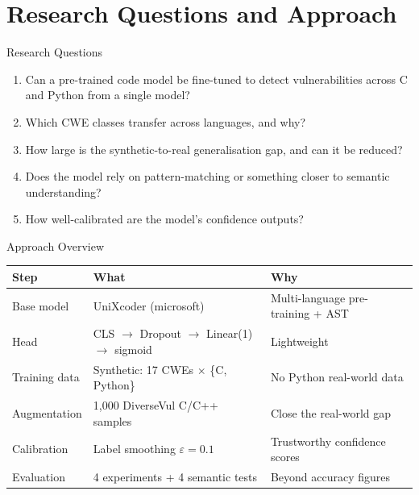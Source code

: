 \documentclass[aspectratio=169]{beamer}
\begin{document}
\section{Research Questions and Approach}

\begin{frame}{Research Questions}
  \begin{enumerate}
    \item[\textbf{RQ1}] Can a pre-trained code model be fine-tuned to detect
      vulnerabilities across C and Python from a single model?
    \item[\textbf{RQ2}] Which CWE classes transfer across languages, and why?
    \item[\textbf{RQ3}] How large is the synthetic-to-real generalisation gap,
      and can it be reduced?
    \item[\textbf{RQ4}] Does the model rely on pattern-matching or something
      closer to semantic understanding?
    \item[\textbf{RQ5}] How well-calibrated are the model's confidence outputs?
  \end{enumerate}
\end{frame}

\begin{frame}{Approach Overview}
  \begin{center}
    \begin{tabular}{lll}
      \toprule
      \textbf{Step} & \textbf{What} & \textbf{Why} \\
      \midrule
      Base model    & UniXcoder (microsoft) & Multi-language pre-training + AST \\
      Head          & CLS $\to$ Dropout $\to$ Linear(1) $\to$ sigmoid & Lightweight \\
      Training data & Synthetic: 17 CWEs $\times$ \{C, Python\} & No Python real-world data \\
      Augmentation  & 1{,}000 DiverseVul C/C++ samples & Close the real-world gap \\
      Calibration   & Label smoothing $\varepsilon=0.1$ & Trustworthy confidence scores \\
      Evaluation    & 4 experiments + 4 semantic tests & Beyond accuracy figures \\
      \bottomrule
    \end{tabular}
  \end{center}
\end{frame}
\end{document}

